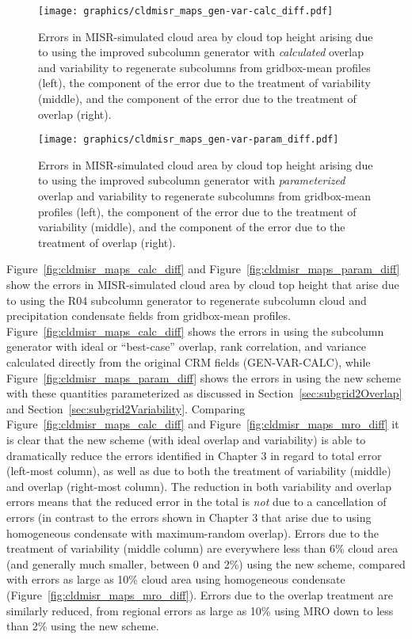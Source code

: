 \begin{figure}[tp]
\centering
\texttt{[image: graphics/cldmisr\_maps\_gen-var-calc\_diff.pdf]}
\caption{\label{fig:cldmisr_maps_calc_diff}Errors in MISR-simulated
cloud area by cloud top height arising due to using the improved
subcolumn generator with \emph{calculated} overlap and variability to
regenerate subcolumns from gridbox-mean profiles (left), the component
of the error due to the treatment of variability (middle), and the
component of the error due to the treatment of overlap
(right).}\label{fig:cldmisrux5fmapsux5fcalcux5fdiff}
\end{figure}

\begin{figure}[tp]
\centering
\texttt{[image: graphics/cldmisr\_maps\_gen-var-param\_diff.pdf]}
\caption{\label{fig:cldmisr_maps_param_diff}Errors in MISR-simulated
cloud area by cloud top height arising due to using the improved
subcolumn generator with \emph{parameterized} overlap and variability to
regenerate subcolumns from gridbox-mean profiles (left), the component
of the error due to the treatment of variability (middle), and the
component of the error due to the treatment of overlap
(right).}\label{fig:cldmisrux5fmapsux5fparamux5fdiff}
\end{figure}

Figure~\ref{fig:cldmisr_maps_calc_diff} and
Figure~\ref{fig:cldmisr_maps_param_diff} show the errors in
MISR-simulated cloud area by cloud top height that arise due to using
the R04 subcolumn generator to regenerate subcolumn cloud and
precipitation condensate fields from gridbox-mean profiles.
Figure~\ref{fig:cldmisr_maps_calc_diff} shows the errors in using the
subcolumn generator with ideal or ``best-case'' overlap, rank
correlation, and variance calculated directly from the original CRM
fields (GEN-VAR-CALC), while Figure~\ref{fig:cldmisr_maps_param_diff}
shows the errors in using the new scheme with these quantities
parameterized as discussed in Section~\ref{sec:subgrid2Overlap} and
Section~\ref{sec:subgrid2Variability}. Comparing
Figure~\ref{fig:cldmisr_maps_calc_diff} and
Figure~\ref{fig:cldmisr_maps_mro_diff} it is clear that the new scheme
(with ideal overlap and variability) is able to dramatically reduce the
errors identified in Chapter 3 in regard to total error (left-most
column), as well as due to both the treatment of variability (middle)
and overlap (right-most column). The reduction in both variability and
overlap errors means that the reduced error in the total is \emph{not}
due to a cancellation of errors (in contrast to the errors shown in
Chapter 3 that arise due to using homogeneous condensate with
maximum-random overlap). Errors due to the treatment of variability
(middle column) are everywhere less than 6\% cloud area (and generally
much smaller, between 0 and 2\%) using the new scheme, compared with
errors as large as 10\% cloud area using homogeneous condensate
(Figure~\ref{fig:cldmisr_maps_mro_diff}). Errors due to the overlap
treatment are similarly reduced, from regional errors as large as 10\%
using MRO down to less than 2\% using the new scheme.

